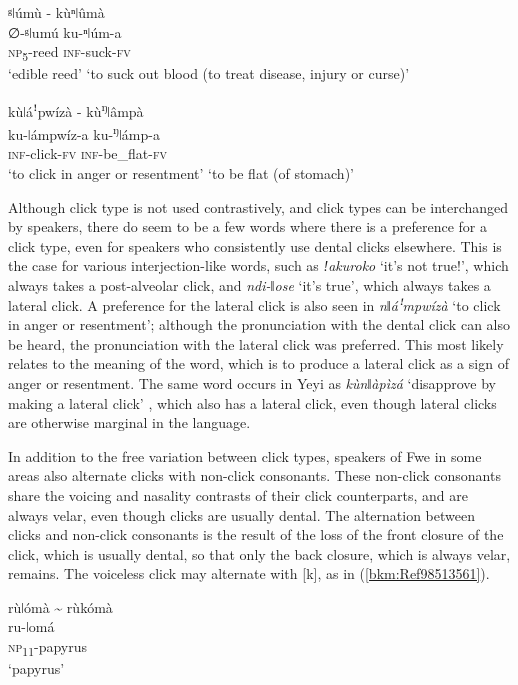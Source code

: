 \ea
\label{bkm:Ref98513542}
ᵍǀúmù    \tab  - \tab  kùⁿǀûmà\\
∅-ᵍǀumú  \tab\tab    ku-ⁿǀúm-a\\
\textsc{np}\textsubscript{5}-reed   \tab\tab   \textsc{inf}-suck-\textsc{fv}\\
\glt ‘edible reed’  \tab    ‘to suck out blood (to treat disease, injury or curse)’
\z

\ea
\label{bkm:Ref98513545}
kùǀáꜝpwízà        - \tab  kù\textsuperscript{ŋ}ǀâmpà\\
ku-ǀámpwíz-a   \tab     ku-\textsuperscript{ŋ}ǀámp-a\\
\textsc{inf}-click-\textsc{fv}     \tab     \textsc{inf}-be\_flat-\textsc{fv}\\
\glt ‘to click in anger or resentment’ \tab  ‘to be flat (of stomach)’
\z

Although click type is not used contrastively, and click types can be interchanged by speakers, there do seem to be a few words where there is a preference for a click type, even for speakers who consistently use dental clicks elsewhere. This is the case for various interjection-like words, such as \textit{ǃakuroko} ‘it’s not true!’, which always takes a post-alveolar click, and \textit{ndi-ǁose} ‘it’s true’, which always takes a lateral click. A preference for the lateral click is also seen in \textit{nǁáꜝ}\textit{mpwízà} ‘to click in anger or resentment’; although the pronunciation with the dental click can also be heard, the pronunciation with the lateral click was preferred. This most likely relates to the meaning of the word, which is to produce a lateral click as a sign of anger or resentment. The same word occurs in Yeyi as \textit{kùnǁàpìzá} ‘disapprove by making a lateral click’ \citep[43]{Seidel2008}, which also has a lateral click, even though lateral clicks are otherwise marginal in the language.

In addition to the free variation between click types, speakers of Fwe in some areas also alternate clicks with non-click consonants. These non-click consonants share the voicing and nasality contrasts of their click counterparts, and are always velar, even though clicks are usually dental. The alternation between clicks and non-click consonants is the result of the loss of the front closure of the click, which is usually dental, so that only the back closure, which is always velar, remains. The voiceless click may alternate with [k], as in (\ref{bkm:Ref98513561}).

\ea
\label{bkm:Ref98513561}
rùǀómà {\textasciitilde} rùkómà\\
ru-ǀomá\\
\textsc{np}\textsubscript{11}-papyrus\\
\glt ‘papyrus’
\z

